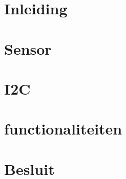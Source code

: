 \documentclass[]{article}
\title{}
\author{Thomas Feys \and Jona Cappelle}
\begin{document}
\maketitle

\tableofcontents


\section{Inleiding}
\section{Sensor}
\section{I2C}
\section{functionaliteiten}
\section{Besluit}
\end{document}
